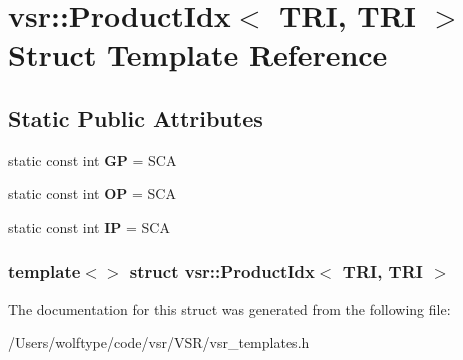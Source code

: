 \hypertarget{structvsr_1_1_product_idx_3_01_t_r_i_00_01_t_r_i_01_4}{\section{vsr\-:\-:Product\-Idx$<$ T\-R\-I, T\-R\-I $>$ Struct Template Reference}
\label{structvsr_1_1_product_idx_3_01_t_r_i_00_01_t_r_i_01_4}
}
\subsection*{Static Public Attributes}
\begin{DoxyCompactItemize}
\item 
\hypertarget{structvsr_1_1_product_idx_3_01_t_r_i_00_01_t_r_i_01_4_aee367a54277dd07ab7aa37b907f0a249}{static const int {\bfseries G\-P} = S\-C\-A}\label{structvsr_1_1_product_idx_3_01_t_r_i_00_01_t_r_i_01_4_aee367a54277dd07ab7aa37b907f0a249}

\item 
\hypertarget{structvsr_1_1_product_idx_3_01_t_r_i_00_01_t_r_i_01_4_abcdd898065d0bd0a11ccd0cf17bd0724}{static const int {\bfseries O\-P} = S\-C\-A}\label{structvsr_1_1_product_idx_3_01_t_r_i_00_01_t_r_i_01_4_abcdd898065d0bd0a11ccd0cf17bd0724}

\item 
\hypertarget{structvsr_1_1_product_idx_3_01_t_r_i_00_01_t_r_i_01_4_acad7576f7725467c15b6b084232fff33}{static const int {\bfseries I\-P} = S\-C\-A}\label{structvsr_1_1_product_idx_3_01_t_r_i_00_01_t_r_i_01_4_acad7576f7725467c15b6b084232fff33}

\end{DoxyCompactItemize}
\subsubsection*{template$<$$>$ struct vsr\-::\-Product\-Idx$<$ T\-R\-I, T\-R\-I $>$}



The documentation for this struct was generated from the following file\-:\begin{DoxyCompactItemize}
\item 
/\-Users/wolftype/code/vsr/\-V\-S\-R/vsr\-\_\-templates.\-h\end{DoxyCompactItemize}
